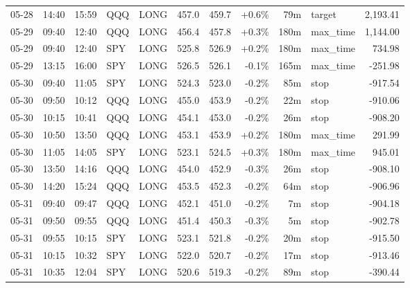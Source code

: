 \documentclass[11pt,a4paper,twoside]{article}
\begin{document}
\begin{center}
\begin{longtable}{>{\color{txtmain}}l l l l l r r r r >{\color{txtmain}}l r}
05-28 & 14:40 & 15:59 & QQQ & LONG & 457.0 & 459.7 & \textcolor{wingreen}{+0.6\%} & 79m & target & \textcolor{wingreen}{2,193.41} \\
05-29 & 09:40 & 12:40 & QQQ & LONG & 456.4 & 457.8 & \textcolor{wingreen}{+0.3\%} & 180m & max\_time & \textcolor{wingreen}{1,144.00} \\
05-29 & 09:40 & 12:40 & SPY & LONG & 525.8 & 526.9 & \textcolor{wingreen}{+0.2\%} & 180m & max\_time & \textcolor{wingreen}{734.98} \\
05-29 & 13:15 & 16:00 & SPY & LONG & 526.5 & 526.1 & \textcolor{lossred}{-0.1\%} & 165m & max\_time & \textcolor{lossred}{-251.98} \\
05-30 & 09:40 & 11:05 & SPY & LONG & 524.3 & 523.0 & \textcolor{lossred}{-0.2\%} & 85m & stop & \textcolor{lossred}{-917.54} \\
05-30 & 09:50 & 10:12 & QQQ & LONG & 455.0 & 453.9 & \textcolor{lossred}{-0.2\%} & 22m & stop & \textcolor{lossred}{-910.06} \\
05-30 & 10:15 & 10:41 & QQQ & LONG & 454.1 & 453.0 & \textcolor{lossred}{-0.2\%} & 26m & stop & \textcolor{lossred}{-908.20} \\
05-30 & 10:50 & 13:50 & QQQ & LONG & 453.1 & 453.9 & \textcolor{wingreen}{+0.2\%} & 180m & max\_time & \textcolor{wingreen}{291.99} \\
05-30 & 11:05 & 14:05 & SPY & LONG & 523.1 & 524.5 & \textcolor{wingreen}{+0.3\%} & 180m & max\_time & \textcolor{wingreen}{945.01} \\
05-30 & 13:50 & 14:16 & QQQ & LONG & 454.0 & 452.9 & \textcolor{lossred}{-0.3\%} & 26m & stop & \textcolor{lossred}{-908.10} \\
05-30 & 14:20 & 15:24 & QQQ & LONG & 453.5 & 452.3 & \textcolor{lossred}{-0.2\%} & 64m & stop & \textcolor{lossred}{-906.96} \\
05-31 & 09:40 & 09:47 & QQQ & LONG & 452.1 & 451.0 & \textcolor{lossred}{-0.2\%} & 7m & stop & \textcolor{lossred}{-904.18} \\
05-31 & 09:50 & 09:55 & QQQ & LONG & 451.4 & 450.3 & \textcolor{lossred}{-0.3\%} & 5m & stop & \textcolor{lossred}{-902.78} \\
05-31 & 09:55 & 10:15 & SPY & LONG & 523.1 & 521.8 & \textcolor{lossred}{-0.2\%} & 20m & stop & \textcolor{lossred}{-915.50} \\
05-31 & 10:15 & 10:32 & SPY & LONG & 522.0 & 520.7 & \textcolor{lossred}{-0.2\%} & 17m & stop & \textcolor{lossred}{-913.46} \\
05-31 & 10:35 & 12:04 & SPY & LONG & 520.6 & 519.3 & \textcolor{lossred}{-0.2\%} & 89m & stop & \textcolor{lossred}{-390.44} \\

\end{longtable}
\end{center}
\end{document}
